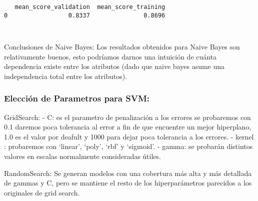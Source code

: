 \documentclass[11pt]{article}
\begin{document}
    
    \begin{verbatim}
   mean_score_validation  mean_score_training
0                 0.8337               0.8696
    \end{verbatim}

    
    \begin{Verbatim}[commandchars=\\\{\}]
 

    \end{Verbatim}

    Conclusiones de Naive Bayes: Los resultados obtenidos para Naive Bayes
son relativamente buenos, esto podríamos darnos una intuición de cuánta
dependencia existe entre los atributos (dado que naive bayes asume una
independencia total entre los atributos).

    \subsubsection{Elección de Parametros para
SVM:}\label{elecciuxf3n-de-parametros-para-svm}

GridSearch: - C: es el parametro de penalización a los errores se
probaremos con 0.1 daremos poca tolerancia al error a fin de que
encuentre un mejor hiperplano, 1.0 es el valor por deafult y 1000 para
dejar poca tolerancia a los errores. - kernel : probaremos con `linear',
`poly', `rbf' y `sigmoid'. - gamma: se probarán distintos valores en
escalas normalmente consideradas útiles.

RandomSearch: Se generan modelos con una cobertura más alta y más
detallada de gammas y C, pero se mantiene el resto de los
hiperparámetros parecidos a los originales de grid search.
\end{document}
